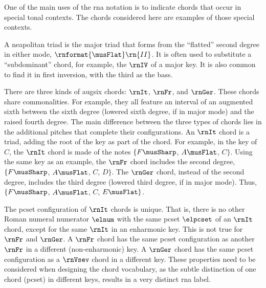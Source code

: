 
One of the main uses of the \gls{rna} notation is to
indicate chords that occur in special tonal contexts. The
chords considered here are examples of those special
contexts.


A \gls{neapolitan} triad is the major triad that forms from
the ``flatted'' second degree in either mode,
$\rnformat{\musFlat}\rn{II}$. It is often used to substitute
a ``subdominant'' chord, for example, the $\rnIV$ of a major
key. It is also common to find it in first inversion, with
the third as the bass.


There are three kinds of \gls{augsix} chords: $\rnIt$,
$\rnFr$, and $\rnGer$. These chords share commonalities. For
example, they all feature an interval of an augmented sixth
between the sixth degree (lowered sixth degree, if in major
mode) and the raised fourth degree. The main difference
between the three types of chords lies in the additional
pitches that complete their configurations. An $\rnIt$ chord
is a triad, adding the root of the key as part of the chord.
For example, in the key of $C$, the $\rnIt$ chord is made of
the notes $\{F\musSharp$, $A\musFlat$, $C\}$. Using the same
key as an example, the $\rnFr$ chord includes the second
degree, $\{F\musSharp$, $A\musFlat$, $C$, $D\}$. The
$\rnGer$ chord, instead of the second degree, includes the
third degree (lowered third degree, if in major mode). Thus,
$\{F\musSharp$, $A\musFlat$, $C$, $E\musFlat\}$.

The \gls{pcset} configuration of $\rnIt$ chords is unique.
That is, there is no other Roman numeral numerator $\elnum$
with the same \gls{pcset} $\elpcset$ of an $\rnIt$ chord,
except for the same $\rnIt$ in an enharmonic key. This is
not true for $\rnFr$ and $\rnGer$. A $\rnFr$ chord has the
same \gls{pcset} configuration as another $\rnFr$ in a
different (non-enharmonic) key. A $\rnGer$ chord has the
same \gls{pcset} configuration as a $\rnVsev$ chord in a
different key. These properties need to be considered when
designing the chord vocabulary, as the subtle distinction of
one chord (\gls{pcset}) in different keys, results in a very
distinct \gls{rna} label.

